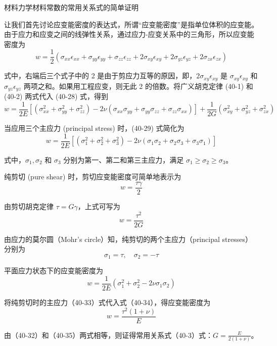 \documentclass[12pt, a4paper, oneside, UTF8]{ctexbook}  %
\begin{document}
\begin{lemma}
    材料力学材料常数的常用关系式的简单证明

    让我们首先讨论应变能密度的表达式，所谓“应变能密度”是指单位体积的应变能。由于应力和应变之间的线弹性关系，通过应力-应变关系中的三角形，所以应变能密度为
\[
w = \frac{1}{2} (\sigma_{xx}\epsilon_{xx} + \sigma_{yy}\epsilon_{yy} + \sigma_{zz}\epsilon_{zz} + 2\sigma_{xy}\epsilon_{xy} + 2\sigma_{yz}\epsilon_{yz} + 2\sigma_{zx}\epsilon_{zx}) \tag{40-28}
\]

式中，右端后三个式子中的 2 是由于剪应力互等的原因，即，\( 2\sigma_{xy}\epsilon_{xy} \) 是 \( \sigma_{xy}\epsilon_{xy} \) 和 \( \sigma_{yz}\epsilon_{yz} \) 两项之和。如果用工程应变，则无此 2 的倍数。将广义胡克定律 (40-1) 和 (40-2) 两式代入 (40-28) 式，得到
\[
w = \frac{1}{2E} [(\sigma_{xx}^2 + \sigma_{yy}^2 + \sigma_{zz}^2) - 2\nu (\sigma_{xx}\sigma_{yy} + \sigma_{yy}\sigma_{zz} + \sigma_{zz}\sigma_{xx})] + \frac{1}{2G} (\sigma_{xy}^2 + \sigma_{yz}^2 + \sigma_{zx}^2) \tag{40-29}
\]

当应用三个主应力 (principal stress) 时，(40-29) 式简化为
\[
w = \frac{1}{2E} [(\sigma_1^2 + \sigma_2^2 + \sigma_3^2) - 2\nu (\sigma_1\sigma_2 + \sigma_2\sigma_3 + \sigma_3\sigma_1)] \tag{40-30}
\]

式中，\( \sigma_1, \sigma_2 \) 和 \( \sigma_3 \) 分别为第一、第二和第三主应力，满足 \( \sigma_1 \geq \sigma_2 \geq \sigma_3 \)。

纯剪切 (pure shear) 时，剪切应变能密度可简单地表示为
\[
w = \frac{\tau \gamma}{2} \tag{40-31}
\]

由剪切胡克定律 \( \tau = G\gamma \)，上式可写为
\[
w = \frac{\tau^2}{2G} \tag{40-32}
\]

由应力的莫尔圆（Mohr's circle）知，纯剪切的两个主应力（principal stresses）分别为
\[
\sigma_1 = \tau, \quad \sigma_2 = -\tau \tag{40-33}
\]

平面应力状态下的应变能密度为
\[
w = \frac{1}{2E} \left( \sigma_1^2 + \sigma_2^2 - 2\nu\sigma_1\sigma_2 \right) \tag{40-34}
\]

将纯剪切时的主应力（40-33）式代入式（40-34），得应变能密度为
\[
w = \frac{\tau^2 (1+\nu)}{E} \tag{40-35}
\]

由（40-32）和（40-35）两式相等，则证得常用关系式（40-3）式：\( G = \frac{E}{2(1+\nu)} \)。
\end{lemma}






\ifx\allfiles\undefined
\end{document}
